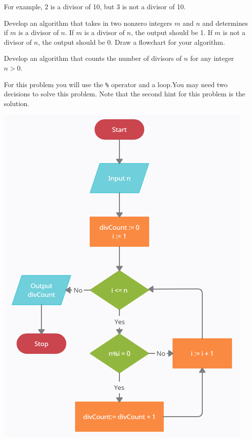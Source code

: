 \documentclass{ximera}
\begin{document}
For example, 2 is a divisor of 10, but 3 is not a divisor of 10.

\begin{question}
	Develop an algorithm that takes in two nonzero integers $m$ and $n$ and determines if $m$ is a divisor of $n$. If $m$ is a divisor of $n$, the output should be 1. If $m$ is not a divisor of $n$, the output should be 0. Draw a flowchart for your algorithm.
	\begin{hint}
		
	\end{hint}
\end{question}

\begin{question}
        Develop an algorithm that counts the number of divisors of $n$ for any integer $n>0$. 
	\begin{hint}
	For this problem you will use the \verb|%| operator and a loop.You may need two decisions to solve this problem. Note that the second hint for this problem is the solution.
	\end{hint}

	\begin{hint}
	\begin{center}
		\includegraphics{divcount.png}
	\end{center}
	\end{hint}
\end{question}
\end{document}
